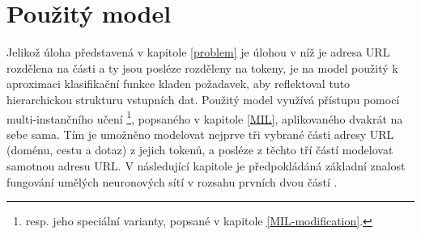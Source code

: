 \chapter{Použitý model}\label{model}

Jelikož úloha představená v kapitole \ref{problem} je úlohou v níž je adresa URL rozdělena na části a ty jsou posléze rozděleny na tokeny, je na model použitý k aproximaci klasifikační funkce kladen požadavek, aby reflektoval tuto hierarchickou strukturu vstupních dat. Použitý model využívá přístupu pomocí multi-instančního učení \footnote{resp. jeho speciální varianty, popsané v kapitole \ref{MIL-modification}.}, popsaného v kapitole \ref{MIL}, aplikovaného dvakrát na sebe sama. Tím je umožněno modelovat nejprve tři vybrané části adresy URL (doménu, cestu a dotaz) z jejich tokenů, a posléze z těchto tří částí modelovat samotnou adresu URL. V následující kapitole je předpokládáná základní znalost fungování umělých neuronových sítí v rozsahu prvních dvou částí \cite{goodfellow_deep_2016}.

